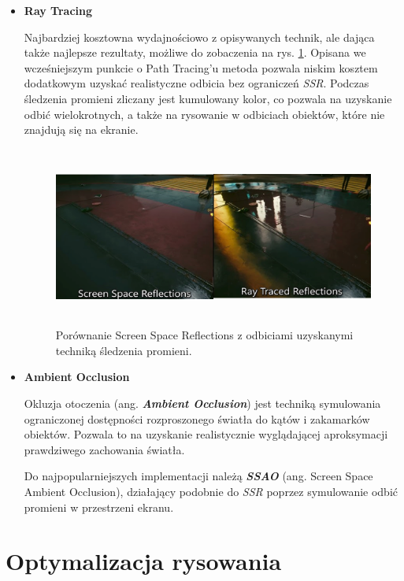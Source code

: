 \begin{itemize}
	\item \textbf{Ray Tracing}

	Najbardziej kosztowna wydajnościowo z opisywanych technik, ale dająca także najlepsze rezultaty, możliwe do zobaczenia na rys. \ref{intro-rt}. Opisana we wcześniejszym punkcie o Path Tracing'u metoda pozwala niskim kosztem dodatkowym uzyskać realistyczne odbicia bez ograniczeń \emph{SSR}. Podczas śledzenia promieni zliczany jest kumulowany kolor, co pozwala na uzyskanie odbić wielokrotnych, a także na rysowanie w odbiciach obiektów, które nie znajdują się na ekranie.

	\begin{figure}[htbp]
		\centering
		\includegraphics[width=5.82534in,height=2.32148in]{images/12_ssr_vs_rt.png}
		\caption{Porównanie Screen Space Reflections z odbiciami uzyskanymi techniką śledzenia promieni. \cite{niktek:reflections:2024}}
		\label{intro-rt}
	\end{figure}
	
	\vfill
	\clearpage
	
	\item \textbf{Ambient Occlusion}
	
	Okluzja otoczenia (ang. \emph{\textbf{Ambient Occlusion}}) jest techniką symulowania ograniczonej dostępności rozproszonego światła do kątów i zakamarków obiektów. Pozwala to na uzyskanie realistycznie wyglądającej aproksymacji prawdziwego zachowania światła.

	Do najpopularniejszych implementacji należą \emph{\textbf{SSAO}} (ang. Screen Space Ambient Occlusion), działający podobnie do \emph{SSR} poprzez symulowanie odbić promieni w przestrzeni ekranu.
\end{itemize}

\section{Optymalizacja rysowania}

